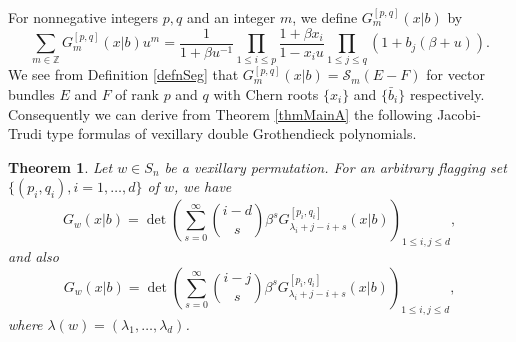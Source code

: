 \documentclass[12pt, reqno,sumlimits]{amsart}
\newtheorem{thm}{Theorem}[section]
\theoremstyle{definition}
\numberwithin{equation}{section}
\newcommand{\CC}{{\mathbb C}}
\newcommand{\ZZ}{{\mathbb Z}}
\newcommand{\bfe}{{\mathbf e}}
\newcommand{\scS}{{\mathscr S}}
\newcommand{\surj}{\twoheadrightarrow}
\newcommand{\Fl}{{Fl}}
\newcommand{\Span}{\operatorname{Span}}
\begin{document}
For nonnegative integers $p,q$ and an integer $m$, we define $G_m^{[p,q]}(x|b)$ by
\[
\sum_{m\in \ZZ} G_m^{[{p},{q}]}(x|b) u^m = \frac{1}{1+\beta u^{-1}} \prod_{1\leq i \leq {p}}\frac{1+\beta x_i}{1-x_iu} \prod_{1\leq j \leq {q}} (1+b_j(\beta + u)).
\]
We see from Definition \ref{defnSeg} that $G_m^{[{p},{q}]}(x|b)=\scS_m(E-F)$ for vector bundles $E$ and $F$ of rank $p$ and $q$ with Chern roots $\{x_i\}$ and $\{\bar b_i\}$ respectively. Consequently we can derive from Theorem \ref{thmMainA} the following Jacobi-Trudi type formulas of vexillary double Grothendieck polynomials. 
\begin{thm}
Let $w \in S_n$ be a vexillary permutation. For an arbitrary flagging set $\{(p_i,q_i), i=1,\dots,d\}$ of $w$,  we have
\[
G_{w}(x|b) = \det\left(  \sum_{s=0}^{\infty} \binom{i-d}{s}\beta^s G_{\lambda_i+j-i+s}^{[p_i,q_i]}(x|b) \right)_{1\leq i,j \leq d},
\]
and also
\[
G_{w}(x|b) = \det\left(  \sum_{s=0}^{\infty} \binom{i-j}{s}\beta^s G_{\lambda_i+j-i+s}^{[p_i,q_i]}(x|b) \right)_{1\leq i,j \leq d},
\]
where $\lambda(w)=(\lambda_1,\dots,\lambda_d)$.
\end{thm}
\end{document}
